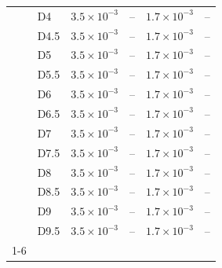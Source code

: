 \begin{tabular}{llllll}
 & D4 & $3.5\times10^{-3}$ & -- & $1.7\times10^{-3}$ & -- \\
 & D4.5 & $3.5\times10^{-3}$ & -- & $1.7\times10^{-3}$ & -- \\
 & D5 & $3.5\times10^{-3}$ & -- & $1.7\times10^{-3}$ & -- \\
 & D5.5 & $3.5\times10^{-3}$ & -- & $1.7\times10^{-3}$ & -- \\
 & D6 & $3.5\times10^{-3}$ & -- & $1.7\times10^{-3}$ & -- \\
 & D6.5 & $3.5\times10^{-3}$ & -- & $1.7\times10^{-3}$ & -- \\
 & D7 & $3.5\times10^{-3}$ & -- & $1.7\times10^{-3}$ & -- \\
 & D7.5 & $3.5\times10^{-3}$ & -- & $1.7\times10^{-3}$ & -- \\
 & D8 & $3.5\times10^{-3}$ & -- & $1.7\times10^{-3}$ & -- \\
 & D8.5 & $3.5\times10^{-3}$ & -- & $1.7\times10^{-3}$ & -- \\
 & D9 & $3.5\times10^{-3}$ & -- & $1.7\times10^{-3}$ & -- \\
 & D9.5 & $3.5\times10^{-3}$ & -- & $1.7\times10^{-3}$ & -- \\
\cline{1-6}
\bottomrule
\end{tabular}
